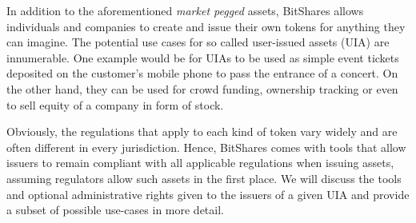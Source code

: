 \label{sec:uia}

In addition to the aforementioned \emph{market pegged} assets, BitShares allows
individuals and companies to create and issue their own tokens for anything
they can imagine. The potential use cases for so called user-issued assets
(UIA) are innumerable. One example would be for UIAs to be used as simple event
tickets deposited on the customer's mobile phone to pass the entrance of a
concert. On the other hand, they can be used for crowd funding, ownership
tracking or even to sell equity of a company in form of stock.

Obviously, the regulations that apply to each kind of token vary widely and are
often different in every jurisdiction. Hence, BitShares comes with tools that
allow issuers to remain compliant with all applicable regulations when issuing
assets, assuming regulators allow such assets in the first place. We will
discuss the tools and optional administrative rights given to the issuers of a
given UIA and provide a subset of possible use-cases in more detail.
